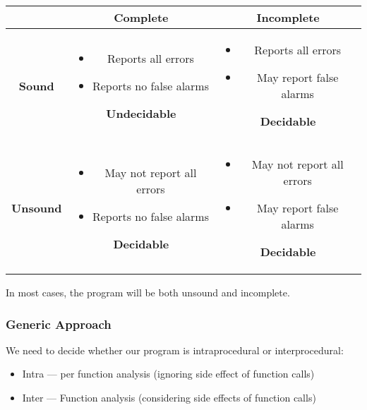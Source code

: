 \documentclass[11pt,a4paper,titlepage,dvipsnames,cmyk]{scrartcl}
\begin{document}
\begin{center}
\begin{tabular}{c|c|c}
   & \textbf{Complete} & \textbf{Incomplete} \\ \hline
   \textbf{Sound} &
   \begin{minipage}[t]{0.4\textwidth}
   \begin{itemize}
   \item Reports all errors
   \item Reports no false alarms
   \end{itemize}
   \centering
   {\color{red}\textbf{Undecidable}}
   \end{minipage}
   &
   \begin{minipage}[t]{0.4\textwidth}
   \begin{itemize}
   \item Reports all errors
   \item May report false alarms
   \end{itemize}
   \centering
   {\color{green}\textbf{Decidable}}
   \end{minipage}
   \\ \hline
   \textbf{Unsound} &
   \begin{minipage}[t]{0.4\textwidth}
   \begin{itemize}
   \item May not report all errors
   \item Reports no false alarms
   \end{itemize}
   \centering
   {\color{green}\textbf{Decidable}}
   \end{minipage}
   &
   \begin{minipage}[t]{0.4\textwidth}
   \begin{itemize}
   \item May not report all errors
   \item May report false alarms
   \end{itemize}
   \centering
   {\color{green}\textbf{Decidable}}
   \end{minipage}
\end{tabular}
\end{center}

In most cases, the program will be both unsound and incomplete.

\subsubsection{Generic Approach}
We need to decide whether our program is intraprocedural or interprocedural:
\begin{itemize}
    \item Intra --- per function analysis (ignoring side effect of function calls)
    \item Inter --- Function analysis (considering side effects of function calls)
\end{itemize}
\end{document}
